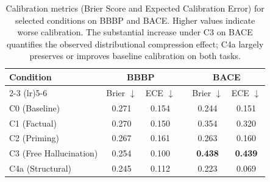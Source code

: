 \begin{table}[t]
\centering
\caption{Calibration metrics (Brier Score and Expected Calibration Error) for selected conditions on BBBP and BACE. Higher values indicate worse calibration. The substantial increase under C3 on BACE quantifies the observed distributional compression effect; C4a largely preserves or improves baseline calibration on both tasks.}
\label{tab:calibration}
\begin{tabular}{lccccc}
\toprule
\textbf{Condition} & \multicolumn{2}{c}{\textbf{BBBP}} & & \multicolumn{2}{c}{\textbf{BACE}} \\ 
\cmidrule(lr){2-3} \cmidrule(lr){5-6}
 & Brier $\downarrow$ & ECE $\downarrow$ & & Brier $\downarrow$ & ECE $\downarrow$ \\ \midrule
C0 (Baseline)      & 0.271 & 0.154 & & 0.244 & 0.151 \\
C1 (Factual)       & 0.270 & 0.150 & & 0.354 & 0.320 \\
C2 (Priming)       & 0.267 & 0.161 & & 0.263 & 0.160 \\
C3 (Free Hallucination) & 0.254 & 0.100 & & \textbf{0.438} & \textbf{0.439} \\
C4a (Structural)   & 0.245 & 0.112 & & 0.223 & 0.069 \\
\bottomrule
\end{tabular}
\end{table}
